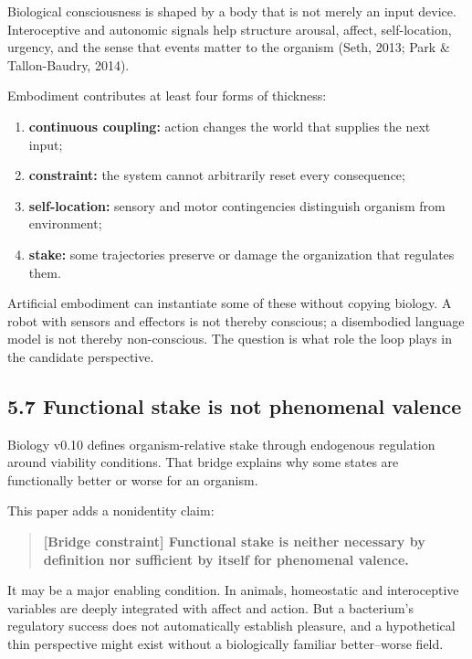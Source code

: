 \documentclass[
  11pt,
]{article}
\providecommand{\tightlist}{%
  \setlength{\itemsep}{0pt}\setlength{\parskip}{0pt}}
\begin{document}
Biological consciousness is shaped by a body that is not merely an input
device. Interoceptive and autonomic signals help structure arousal,
affect, self-location, urgency, and the sense that events matter to the
organism (Seth, 2013; Park \& Tallon-Baudry, 2014).

Embodiment contributes at least four forms of thickness:

\begin{enumerate}
\def\labelenumi{\arabic{enumi}.}
\tightlist
\item
  \textbf{continuous coupling:} action changes the world that supplies
  the next input;
\item
  \textbf{constraint:} the system cannot arbitrarily reset every
  consequence;
\item
  \textbf{self-location:} sensory and motor contingencies distinguish
  organism from environment;
\item
  \textbf{stake:} some trajectories preserve or damage the organization
  that regulates them.
\end{enumerate}

Artificial embodiment can instantiate some of these without copying
biology. A robot with sensors and effectors is not thereby conscious; a
disembodied language model is not thereby non-conscious. The question is
what role the loop plays in the candidate perspective.

\subsection{5.7 Functional stake is not phenomenal
valence}\label{functional-stake-is-not-phenomenal-valence}

Biology v0.10 defines organism-relative stake through endogenous
regulation around viability conditions. That bridge explains why some
states are functionally better or worse for an organism.

This paper adds a nonidentity claim:

\begin{quote}
\textbf{{[}Bridge constraint{]} Functional stake is neither necessary by
definition nor sufficient by itself for phenomenal valence.}
\end{quote}

It may be a major enabling condition. In animals, homeostatic and
interoceptive variables are deeply integrated with affect and action.
But a bacterium's regulatory success does not automatically establish
pleasure, and a hypothetical thin perspective might exist without a
biologically familiar better--worse field.
\end{document}
